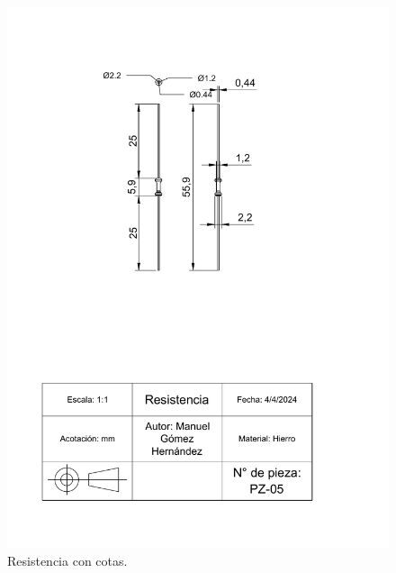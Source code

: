     
    \begin{figure}[H]
        \centering
        \includegraphics[scale=0.4]{15/img/resistenciaTrazo.pdf}
        \caption{Resistencia con cotas.}
        \label{fig:resistenciaTrazo}
    \end{figure}
    
